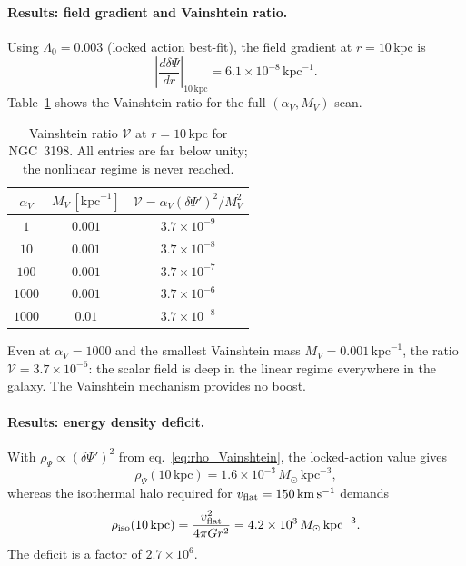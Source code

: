 \documentclass[12pt,a4paper]{article}
\begin{document}
\paragraph{Results: field gradient and Vainshtein ratio.}
Using $\Lambda_0 = 0.003$ (locked action best-fit), the field gradient at
$r = 10\,\mathrm{kpc}$ is
\begin{equation}
\left|\frac{d\delta\Psi}{dr}\right|_{10\,\mathrm{kpc}} = 6.1\times10^{-8}\,\mathrm{kpc}^{-1}.
\end{equation}
Table~\ref{tab:sim103_vainshtein} shows the Vainshtein ratio for the full
$(\alpha_V, M_V)$ scan.

\begin{table}[h]
\begin{center}
\caption{Vainshtein ratio $\mathcal{V}$ at $r=10\,\mathrm{kpc}$ for NGC~3198.
All entries are far below unity; the nonlinear regime is never reached.}
\label{tab:sim103_vainshtein}
\begin{tabular}{ccc}
\toprule
$\alpha_V$ & $M_V\,[\mathrm{kpc}^{-1}]$ & $\mathcal{V} = \alpha_V(\delta\Psi')^2/M_V^2$ \\
\midrule
$1$    & $0.001$ & $3.7\times10^{-9}$ \\
$10$   & $0.001$ & $3.7\times10^{-8}$ \\
$100$  & $0.001$ & $3.7\times10^{-7}$ \\
$1000$ & $0.001$ & $3.7\times10^{-6}$ \\
$1000$ & $0.01$  & $3.7\times10^{-8}$ \\
\bottomrule
\end{tabular}
\end{center}
\end{table}

Even at $\alpha_V = 1000$ and the smallest Vainshtein mass $M_V = 0.001\,\mathrm{kpc}^{-1}$,
the ratio $\mathcal{V} = 3.7\times10^{-6}$: the scalar field is deep in the linear
regime everywhere in the galaxy.  The Vainshtein mechanism provides no boost.

\paragraph{Results: energy density deficit.}
With $\rho_\Psi \propto (\delta\Psi')^2$ from eq.~\eqref{eq:rho_Vainshtein},
the locked-action value gives
\begin{equation}
\rho_\Psi(10\,\mathrm{kpc}) = 1.6\times10^{-3}\,M_\odot\,\mathrm{kpc}^{-3},
\end{equation}
whereas the isothermal halo required for $v_{\rm flat} = 150\,\mathrm{km\,s^{-1}}$ demands
\begin{equation}
\rho_{\rm iso}(10\,\mathrm{kpc}) = \frac{v_{\rm flat}^2}{4\pi G r^2}
  = 4.2\times10^{3}\,M_\odot\,\mathrm{kpc}^{-3}.
\end{equation}
The deficit is a factor of $2.7\times10^6$.
\end{document}
